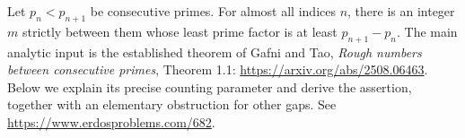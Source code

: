Let \(p_n<p_{n+1}\) be consecutive primes. For almost all indices
\(n\), there is an integer \(m\) strictly between them whose least
prime factor is at least \(p_{n+1}-p_n\).
The main analytic input is the established theorem of Gafni and Tao,
\emph{Rough numbers between consecutive primes}, Theorem 1.1:
\url{https://arxiv.org/abs/2508.06463}.
Below we explain its precise counting parameter and derive the
assertion, together with an elementary obstruction for other gaps.
See \url{https://www.erdosproblems.com/682}.
